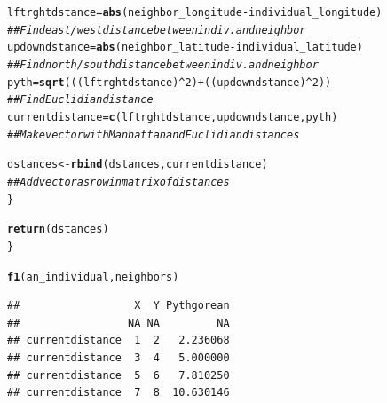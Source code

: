 \documentclass{article}\usepackage[]{graphicx}\usepackage[]{color}
\makeatletter
\newcommand{\hlnum}[1]{\textcolor[rgb]{0.686,0.059,0.569}{#1}}%
\newcommand{\hlcom}[1]{\textcolor[rgb]{0.678,0.584,0.686}{\textit{#1}}}%
\newcommand{\hlopt}[1]{\textcolor[rgb]{0,0,0}{#1}}%
\newcommand{\hlstd}[1]{\textcolor[rgb]{0.345,0.345,0.345}{#1}}%
\newcommand{\hlkwb}[1]{\textcolor[rgb]{0.69,0.353,0.396}{#1}}%
\newcommand{\hlkwd}[1]{\textcolor[rgb]{0.737,0.353,0.396}{\textbf{#1}}}%
\newenvironment{kframe}{%
 \def\at@end@of@kframe{}%
 \ifinner\ifhmode%
  \def\at@end@of@kframe{\end{minipage}}%
  \begin{minipage}{\columnwidth}%
 \fi\fi%
 \def\FrameCommand##1{\hskip\@totalleftmargin \hskip-\fboxsep
 \colorbox{shadecolor}{##1}\hskip-\fboxsep
     \hskip-\linewidth \hskip-\@totalleftmargin \hskip\columnwidth}%
 \MakeFramed {\advance\hsize-\width
   \@totalleftmargin\z@ \linewidth\hsize
   \@setminipage}}%
 {\par\unskip\endMakeFramed%
 \at@end@of@kframe}
\newenvironment{knitrout}{}{} %
\makeatother
\begin{document}
\begin{knitrout}
\begin{kframe}
\begin{alltt}
    \hlstd{lftrghtdstance} \hlkwb{=} \hlkwd{abs}\hlstd{(neighbor_longitude} \hlopt{-} \hlstd{individual_longitude)}
    \hlcom{## Find east/west distance between indiv. and neighbor}
    \hlstd{updowndstance} \hlkwb{=} \hlkwd{abs}\hlstd{(neighbor_latitude} \hlopt{-} \hlstd{individual_latitude)}
    \hlcom{## Find north/south distance between indiv. and neighbor}
    \hlstd{pyth} \hlkwb{=} \hlkwd{sqrt}\hlstd{(((lftrghtdstance)}\hlopt{^}\hlnum{2}\hlstd{)} \hlopt{+} \hlstd{((updowndstance)}\hlopt{^}\hlnum{2}\hlstd{))}
    \hlcom{## Find Euclidian distance}
    \hlstd{currentdistance} \hlkwb{=} \hlkwd{c}\hlstd{(lftrghtdstance,updowndstance,pyth)}
    \hlcom{## Make vector with Manhattan and Euclidian distances}


    \hlstd{dstances} \hlkwb{<-} \hlkwd{rbind}\hlstd{(dstances, currentdistance)}
    \hlcom{## Add vector as row in matrix of distances}
  \hlstd{\}}

  \hlkwd{return}\hlstd{(dstances)}
\hlstd{\}}

\hlkwd{f1}\hlstd{(an_individual, neighbors)}
\end{alltt}
\begin{verbatim}
##                  X  Y Pythgorean
##                 NA NA         NA
## currentdistance  1  2   2.236068
## currentdistance  3  4   5.000000
## currentdistance  5  6   7.810250
## currentdistance  7  8  10.630146
\end{verbatim}
\end{kframe}
\end{knitrout}
\end{document}
